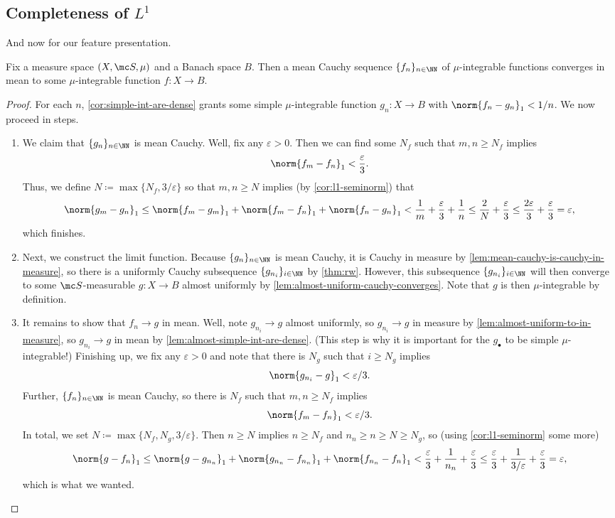 \documentclass[../notes.tex]{subfiles}
\begin{document}
\subsection{Completeness of \texorpdfstring{$L^1$}{ L1}}
And now for our feature presentation.
\begin{proposition} \label{prop:l1-complete}
	Fix a measure space $(X,\mc S,\mu)$ and a Banach space $B$. Then a mean Cauchy sequence $\{f_n\}_{n\in\NN}$ of $\mu$-integrable functions converges in mean to some $\mu$-integrable function $f\colon X\to B$.
\end{proposition}
\begin{proof}
	For each $n$, \autoref{cor:simple-int-are-dense} grants some simple $\mu$-integrable function $g_n\colon X\to B$ with $\norm{f_n-g_n}_1<1/n$. We now proceed in steps.
	\begin{enumerate}
		\item We claim that $\{g_n\}_{n\in\NN}$ is mean Cauchy. Well, fix any $\varepsilon>0$. Then we can find some $N_f$ such that $m,n\ge N_f$ implies
		\[\norm{f_m-f_n}_1<\frac\varepsilon3.\]
		Thus, we define $N\coloneqq\max\{N_f,3/\varepsilon\}$ so that $m,n\ge N$ implies (by \autoref{cor:l1-seminorm}) that
		\[\norm{g_m-g_n}_1\le\norm{f_m-g_m}_1+\norm{f_m-f_n}_1+\norm{f_n-g_n}_1<\frac1m+\frac\varepsilon3+\frac1n\le\frac2N+\frac\varepsilon3\le\frac{2\varepsilon}3+\frac\varepsilon3=\varepsilon,\]
		which finishes.
		\item Next, we construct the limit function. Because $\{g_n\}_{n\in\NN}$ is mean Cauchy, it is Cauchy in measure by \autoref{lem:mean-cauchy-is-cauchy-in-measure}, so there is a uniformly Cauchy subsequence $\{g_{n_i}\}_{i\in\NN}$ by \autoref{thm:rw}. However, this subsequence $\{g_{n_i}\}_{i\in\NN}$ will then converge to some $\mc S$-measurable $g\colon X\to B$ almost uniformly by \autoref{lem:almost-uniform-cauchy-converges}. Note that $g$ is then $\mu$-integrable by definition.
		\item It remains to show that $f_n\to g$ in mean. Well, note $g_{n_i}\to g$ almost uniformly, so $g_{n_i}\to g$ in measure by \autoref{lem:almost-uniform-to-in-measure}, so $g_{n_i}\to g$ in mean by \autoref{lem:almost-simple-int-are-dense}. (This step is why it is important for the $g_\bullet$ to be simple $\mu$-integrable!) Finishing up, we fix any $\varepsilon>0$ and note that there is $N_g$ such that $i\ge N_g$ implies
		\[\norm{g_{n_i}-g}_1<\varepsilon/3.\]
		Further, $\{f_n\}_{n\in\NN}$ is mean Cauchy, so there is $N_f$ such that $m,n\ge N_f$ implies
		\[\norm{f_m-f_n}_1<\varepsilon/3.\]
		In total, we set $N\coloneqq\max\{N_f,N_g,3/\varepsilon\}$. Then $n\ge N$ implies $n\ge N_f$ and $n_n\ge n\ge N\ge N_g$, so (using \autoref{cor:l1-seminorm} some more)
		\[\norm{g-f_n}_1\le\norm{g-g_{n_n}}_1+\norm{g_{n_n}-f_{n_n}}_1+\norm{f_{n_n}-f_n}_1<\frac\varepsilon3+\frac1{n_n}+\frac\varepsilon3\le\frac\varepsilon3+\frac1{3/\varepsilon}+\frac\varepsilon3=\varepsilon,\]
		which is what we wanted.
		\qedhere
	\end{enumerate}
\end{proof}
\end{document}

